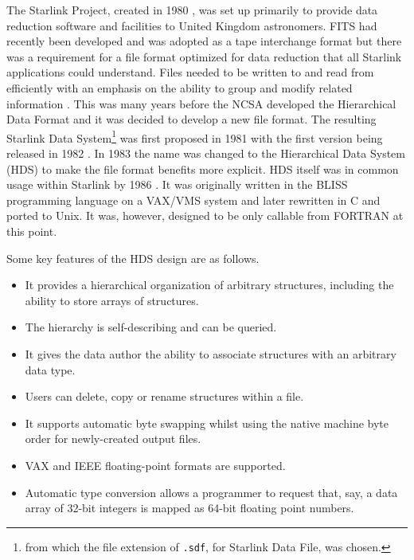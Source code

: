 \documentclass[final,authoryear,5p,times,twocolumn]{elsarticle}
\begin{document}
The Starlink Project, created in 1980
\citep{1980IrAJ...14..197E,1982MmSAI..53...55T,1982QJRAS..23..485D}, was set up
primarily to provide data reduction software and facilities to United
Kingdom astronomers. FITS
\citep{1979ipia.coll..445W,1981A&AS...44..363W} had recently been
developed and was adopted as a tape interchange format but there was a
requirement for a file format optimized for data reduction that all
Starlink applications could understand. Files
needed to be written to and read from efficiently with an emphasis on the
ability to group and modify related information
\citep{1981STARENT4}. This was many years before the NCSA developed
the Hierarchical Data Format \citep{HDF1,Folk2010} and it was decided
to develop a new file format. The resulting Starlink Data
System\footnote{from which the file extension of \texttt{.sdf}, for
  Starlink Data File, was chosen.} was first proposed in 1981 with the
first version being released in 1982 \citep[see
e.g.][]{1982QJRAS..23..485D,1991STARB...8....2L}. In 1983 the name was
changed to the Hierarchical Data System (HDS) to make the file format
benefits more explicit. HDS itself was in common usage within Starlink by 1986
\citep{1986BICDS..30...13L}. It was originally written in the BLISS
programming language on a VAX/VMS system and later rewritten in C and
ported to Unix.
It was, however, designed to be only callable from FORTRAN at this point.

Some key features of the HDS design are as follows.
\begin{itemize}
\item It provides a hierarchical organization of arbitrary structures, including the
  ability to store arrays of structures.
\item The hierarchy is self-describing and can be queried.
\item It gives the data author the ability to associate structures with an arbitrary data type.
\item Users can delete, copy or rename structures within a file.
\item It supports automatic byte swapping whilst using the native machine byte order
  for newly-created output files.
\item VAX and IEEE floating-point formats are supported.
\item Automatic type conversion allows a programmer to request that,
  say, a data array of 32-bit integers is mapped as 64-bit floating
  point numbers.
\end{itemize}
\end{document}
